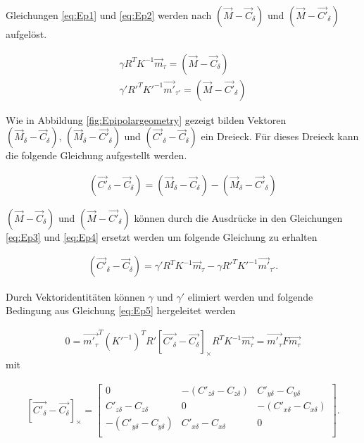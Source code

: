 Gleichungen \ref{eq:Ep1} und \ref{eq:Ep2} werden nach $(\vec{M}-\vec{C}_\delta)$ und $(\vec{M}-\vec{C'}_\delta)$ aufgelöst.

\begin{gather}
	\gamma R^TK^{-1}\vec{m}_\tau = (\vec{M}-\vec{C}_\delta)\label{eq:Ep3}\\
	\gamma' R'^TK'^{-1}\vec{m'}_{\tau'} = (\vec{M}-\vec{C'}_\delta)\label{eq:Ep4}
\end{gather}


Wie in Abbildung \ref{fig:Epipolargeometry} gezeigt bilden Vektoren $(\vec{M}_\delta - \vec{C}_\delta),\, (\vec{M}_\delta - \vec{C'}_\delta)$ und $(\vec{C'}_\delta - \vec{C}_\delta)$ ein Dreieck. Für dieses Dreieck kann die folgende Gleichung aufgestellt werden. 

\begin{gather}
	(\vec{C'}_\delta - \vec{C}_\delta) = (\vec{M}_\delta - \vec{C}_\delta) - (\vec{M}_\delta - \vec{C'}_\delta)
\end{gather}

$(\vec{M}-\vec{C}_\delta)$ und $(\vec{M} - \vec{C'}_\delta)$ können durch die Ausdrücke in den Gleichungen \ref{eq:Ep3} und \ref{eq:Ep4} ersetzt werden um folgende Gleichung zu erhalten

\begin{gather}
	(\vec{C'}_\delta - \vec{C}_\delta) = \gamma' R^TK^{-1}\vec{m}_\tau - \gamma R'^TK'^{-1}\vec{m'}_{\tau'}. \label{eq:Ep5}
\end{gather}

Durch Vektoridentitäten können $\gamma$ und $\gamma'$ elimiert werden und folgende Bedingung  aus Gleichung \ref{eq:Ep5} hergeleitet werden \cite{Bronstein} %

\begin{gather}
	0=\vec{m'_\tau}^T(K'^{-1})^TR' \left[ \vec{C'_\delta}-\vec{C_\delta}\right]_\times R^TK^{-1}\vec{m_\tau}=\vec{m'_\tau}F\vec{m_\tau}\label{eq:Ep6}
\end{gather}
mit  

\begin{gather}
	\left[ \vec{C'_\delta}-\vec{C_\delta}\right]_\times=
	\begin{bmatrix}0&-(C'_{z\delta}-C_{z\delta})&C'_{y\delta}-C_{y\delta}\\
		C'_{z\delta}-C_{z\delta}&0&-(C'_{x\delta}-C_{x\delta})\\
		-(C'_{y\delta}-C_{y\delta})&C'_{x \delta}-C_{x\delta}&0\\
	\end{bmatrix}.
\end{gather}

